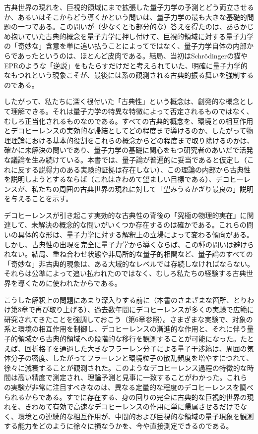 古典世界の現れを、巨視的領域にまで拡張した量子力学の予測とどう両立させるか、あるいはそこからどう導くかという問いは、量子力学の最も大きな基礎的問題の一つである。この問いが（少なくとも部分的な）答えを得たのは、あらかじめ抱いていた古典的概念を量子力学に押し付けて、巨視的領域に対する量子力学の「奇妙な」含意を単に追い払うことによってではなく、\hypertarget{srcpage:9}{}\label{srcpage:9}量子力学自体の内部からであったというのは、ほとんど皮肉である。結局、当初はSchrödingerの猫やEPRのような「逆説」をもたらすだけだと考えられていた、明確に量子力学的なもつれという現象こそが、最後には系の観測される古典的振る舞いを強制するのである。

したがって、私たちに深く根付いた「古典性」という概念は、創発的な概念として理解できる。それは量子力学の特異な特徴によって否定されるものではなく、むしろ正当化されるものなのである。すべての古典的概念を、環境との相互作用とデコヒーレンスの実効的な帰結としてどの程度まで導けるのか、したがって物理理論における基本的役割をこれらの概念からどの程度まで取り除けるのかは、確かに未解決の問いであり、量子力学の基礎に関心をもつ研究者のあいだで活発な議論を生み続けている。本書では、量子論が普遍的に妥当であると仮定し（これに反する説得力のある実験的証拠は存在しない）、この理論の内部から古典性を説明しようとするならば（これはきわめて望ましい目標である）、デコヒーレンスが、私たちの周囲の古典世界の現れに対して「望みうるかぎり最良の」説明を与えることを示す。

デコヒーレンスが引き起こす実効的な古典性の背後の「究極の物理的実在」に関連して、未解決の概念的な問いがいくつか存在するのは確かである。これらの問いの具体的な形は、量子力学に対する解釈上の立場によって変わる傾向がある。しかし、古典性の出現を完全に量子力学から導くならば、この種の問いは避けられない。結局、重ね合わせ状態や非局所的な量子的相関など、量子論のすべての「奇妙な」非古典的現象は、ある大域的なレベルでは存続しなければならない。それらは公準によって追い払われたのではなく、むしろ私たちの経験する古典世界を導くために使われたからである。

こうした解釈上の問題にあまり深入りする前に（本書のさまざまな箇所、とりわけ第8章で再び取り上げる）、過去数年間にデコヒーレンスが多くの実験で広範に研究されてきたことを強調しておこう（第6章参照）。さまざまな実験で、対象の系と環境の相互作用を制御し、デコヒーレンスの漸進的な作用と、それに伴う量子的領域から古典的領域への段階的な移行を観測することが可能になった。たとえば、回折格子を通過した大きなフラーレン分子による量子干渉縞は、周囲の気体分子の密度、したがってフラーレンと環境粒子の散乱頻度を増やすにつれて、徐々に減衰することが観測された。このようなデコヒーレンス過程の特徴的な時間は高い精度で測定され、理論予測と見事に一致することがわかった。これらの実験が非常に注目すべきなのは、異なる定量的な程度のデコヒーレンスを調べられるからである。すでに存在する、身の回りの完全に古典的な巨視的世界の現れを、きわめて有効で高速なデコヒーレンスの作用に単に帰属させるだけでなく、環境との連続的な相互作用が、中間的および巨視的な領域の量子現象を観測する能力をどのように徐々に損なうかを、今や直接測定できるのである。

